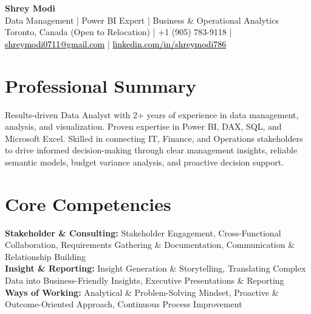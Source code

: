 \documentclass[10.5pt,letterpaper]{article}
\begin{document}
\begin{center}
  {\Huge \bfseries \color{accent} Shrey Modi}\\[0.3em]
  {\normalsize Data Management | Power BI Expert | Business \& Operational Analytics}\\[0.1em]
  {\small Toronto, Canada (Open to Relocation) | +1 (905) 783-9118 | \href{mailto:shreymodi0711@gmail.com}{\textcolor{black}{shreymodi0711@gmail.com}} | \href{https://linkedin.com/in/shreymodi786}{\textcolor{black}{linkedin.com/in/shreymodi786}}}
\end{center}
\vspace{-12pt}

\section{Professional Summary}
\noindent Results-driven Data Analyst with 2+ years of experience in data management, analysis, and visualization. Proven expertise in Power BI, DAX, SQL, and Microsoft Excel. Skilled in connecting IT, Finance, and Operations stakeholders to drive informed decision-making through clear management insights, reliable semantic models, budget variance analysis, and proactive decision support.

\section{Core Competencies}
\noindent
\textbf{Stakeholder \& Consulting:} Stakeholder Engagement, Cross-Functional Collaboration, Requirements Gathering \& Documentation, Communication \& Relationship Building\\\textbf{Insight \& Reporting:} Insight Generation \& Storytelling, Translating Complex Data into Business-Friendly Insights, Executive Presentations \& Reporting\\\textbf{Ways of Working:} Analytical \& Problem-Solving Mindset, Proactive \& Outcome-Oriented Approach, Continuous Process Improvement
\end{document}
